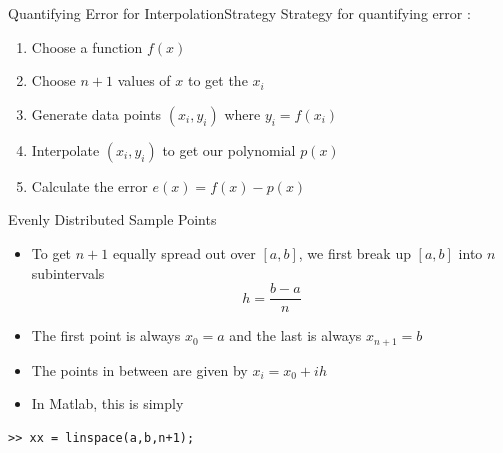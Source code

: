 \documentclass[10pt]{beamer}
\begin{document}
\begin{frame}{Quantifying Error for Interpolation}{Strategy}
Strategy for quantifying error : 
\begin{enumerate}
    \item Choose a function $f(x)$

    \item Choose $n+1$ values of $x$ to get the $x_i$

    \item Generate data points $(x_i,y_i)$ where $y_i =f(x_i)$

    \item Interpolate $(x_i,y_i)$ to get our polynomial $p(x)$

    \item Calculate the error $e(x) = f(x) - p(x)$
\end{enumerate}

\vspace{5mm}
{
}


\end{frame}


\begin{frame}[fragile]{Evenly Distributed Sample Points}
\begin{itemize}
\item To get $n+1$ equally spread out over $[a,b]$, we first break up $[a,b]$ into $n$ subintervals $$h = \frac{b-a}{n}$$
\item The first point is always $x_0=a$ and the last is always $x_{n+1}=b$
\item The points in between are given by $x_i = x_0 + ih$
\item In Matlab, this is simply 
\end{itemize}
\begin{lstlisting} 
>> xx = linspace(a,b,n+1);
\end{lstlisting} 
\end{frame}

\end{document}
